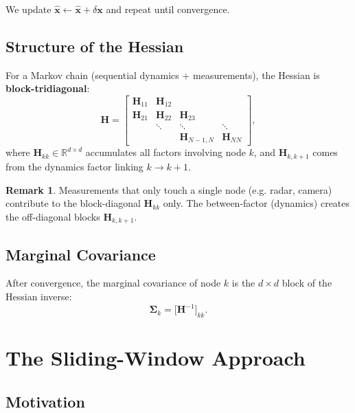 \documentclass[11pt,a4paper]{article}
\newcommand{\bx}{\bm{x}}
\newcommand{\bH}{\bm{H}}
\newcommand{\bSigma}{\bm{\Sigma}}
\newcommand{\R}{\mathbb{R}}
\newcommand{\eg}{e.g.}
\theoremstyle{definition}
\newtheorem{remark}{Remark}[section]
\theoremstyle{plain}
\begin{document}
We update $\hat{\bx} \leftarrow \hat{\bx} + \delta\bx$ and repeat until
convergence.

\subsection{Structure of the Hessian}

For a Markov chain (sequential dynamics + measurements), the Hessian is
\textbf{block-tridiagonal}:
\begin{equation}
  \bH = \begin{bmatrix}
    \bH_{11} & \bH_{12} & & \\
    \bH_{21} & \bH_{22} & \bH_{23} & \\
    & \ddots & \ddots & \ddots \\
    & & \bH_{N-1,N} & \bH_{NN}
  \end{bmatrix},
  \label{eq:H_banded}
\end{equation}
where $\bH_{kk} \in \R^{d \times d}$ accumulates all factors involving
node $k$, and $\bH_{k,k+1}$ comes from the dynamics factor linking $k \to k+1$.

\begin{remark}
  Measurements that only touch a single node (\eg{} radar, camera) contribute
  to the block-diagonal $\bH_{kk}$ only.  The between-factor (dynamics)
  creates the off-diagonal blocks $\bH_{k,k+1}$.
\end{remark}

\subsection{Marginal Covariance}

After convergence, the marginal covariance of node $k$ is the $d \times d$
block of the Hessian inverse:
\begin{equation}
  \bSigma_k = \bigl[\bH^{-1}\bigr]_{kk}.
  \label{eq:marginal_cov}
\end{equation}

\section{The Sliding-Window Approach}
\label{sec:sliding_window}

\subsection{Motivation}
\end{document}
